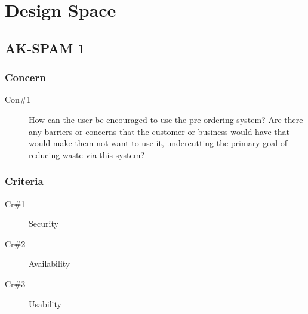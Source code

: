 \documentclass[11pt]{article}
\begin{document}
\newpage
\section{Design Space}
\label{sec:org00319d3}
\subsection*{AK-SPAM 1}
\label{sec:org559c36a}
\subsubsection*{Concern}
\label{sec:orgc5cd4f4}
\begin{description}
\item[{Con\#1}] How can the user be encouraged to use the pre-ordering
system? Are there any barriers or concerns that the
customer or business would have that would make them
not want to use it, undercutting the primary goal of
reducing waste via this system?
\end{description}
\subsubsection*{Criteria}
\label{sec:org99902bb}
\begin{description}
\item[{Cr\#1}] Security
\item[{Cr\#2}] Availability
\item[{Cr\#3}] Usability
\end{description}
\end{document}
